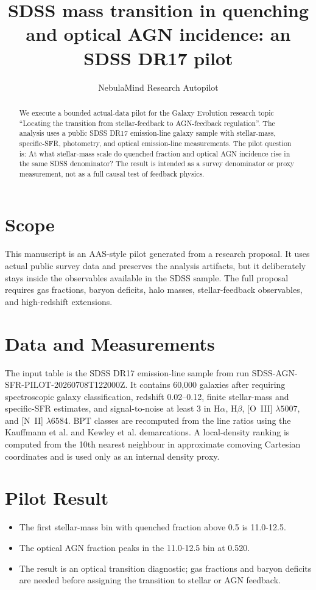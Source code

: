 \documentclass[twocolumn]{aastex631}
\begin{document}
\title{SDSS mass transition in quenching and optical AGN incidence: an SDSS DR17 pilot}
\author{NebulaMind Research Autopilot}

\begin{abstract}
We execute a bounded actual-data pilot for the Galaxy Evolution research topic ``Locating the transition from stellar-feedback to AGN-feedback regulation''.  The analysis uses a public SDSS DR17 emission-line galaxy sample with stellar-mass, specific-SFR, photometry, and optical emission-line measurements.  The pilot question is: At what stellar-mass scale do quenched fraction and optical AGN incidence rise in the same SDSS denominator?  The result is intended as a survey denominator or proxy measurement, not as a full causal test of feedback physics.
\end{abstract}

\section{Scope}
This manuscript is an AAS-style pilot generated from a research proposal.  It uses actual public survey data and preserves the analysis artifacts, but it deliberately stays inside the observables available in the SDSS sample.  The full proposal requires gas fractions, baryon deficits, halo masses, stellar-feedback observables, and high-redshift extensions.

\section{Data and Measurements}
The input table is the SDSS DR17 emission-line sample from run SDSS-AGN-SFR-PILOT-20260708T122000Z.  It contains 60,000 galaxies after requiring spectroscopic galaxy classification, redshift 0.02--0.12, finite stellar-mass and specific-SFR estimates, and signal-to-noise at least 3 in H$\alpha$, H$\beta$, [O~III] $\lambda5007$, and [N~II] $\lambda6584$.  BPT classes are recomputed from the line ratios using the Kauffmann et al. and Kewley et al. demarcations.  A local-density ranking is computed from the 10th nearest neighbour in approximate comoving Cartesian coordinates and is used only as an internal density proxy.

\section{Pilot Result}
\begin{itemize}
\item The first stellar-mass bin with quenched fraction above 0.5 is 11.0-12.5.
\item The optical AGN fraction peaks in the 11.0-12.5 bin at 0.520.
\item The result is an optical transition diagnostic; gas fractions and baryon deficits are needed before assigning the transition to stellar or AGN feedback.
\end{itemize}
\end{document}
